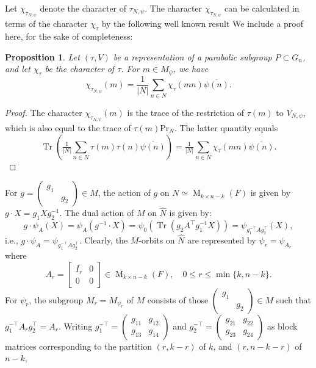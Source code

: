 \documentclass[reqno]{amsart}
\newtheorem{proposition}[theorem]{Proposition}
\theoremstyle{definition}
\theoremstyle{remark}
\numberwithin{equation}{section}
\DeclareMathOperator{\GL}{GL}
\DeclareMathOperator{\M}{M}
\DeclareMathOperator{\tr}{Tr}
\newcommand{\bbsm}{\left (\begin{smallmatrix}}      \newcommand{\besm}{\end{smallmatrix}\right )}
\begin{document}
 Let $\chi_{\tau_{N, \psi}}$ denote the character of $\tau_{N, \psi}$. The character $\chi_{\tau_{N, \psi}}$ can be calculated in terms of the character $\chi_\tau$  by the following well known result 
 We include a proof here, for the sake of completeness:
\begin{proposition} \label{character_Jacquet}
Let $(\tau,V)$ be a representation of a parabolic subgroup $P \subset G_n$,  and let $\chi_\tau$ be the character of $\tau$. For $m \in M_\psi$, we have
\[\chi_{\tau_{N, \psi}}(m) = \frac{1}{|N|}\sum_{n \in N}\chi_{\tau}(mn)\overline{\psi(n)}.\]
\end{proposition}
\begin{proof}
The character  $\chi_{\tau_{N, \psi}}(m)$ is the trace of the restriction of $\tau(m)$ to ${V_{N,\psi}}$, which is also equal to the trace of $\tau(m) \text{Pr}_N$.   The latter quantity equals
\[ \tr\left( \tfrac{1}{|N|} \sum_{n\in N} \tau(m)\tau(n) \overline{\psi(n)}\right)=\tfrac{1}{|N|} \sum_{n\in N}  \chi_{\tau}(mn) \overline{\psi(n)}.\]

\end{proof}
For  $g=\bbsm g_1 & \\& g_2 \besm \in M$, the action of $g$ on $N \simeq \M_{k \times n-k}(F)$ is given by $g \cdot X= g_1 X g_2^{-1}$.
The dual action of $M$ on $\widehat N$ is  given by:  
\[g \cdot \psi_A(X)=\psi_A(g^{-1} \cdot X)=\psi_0(\tr(g_2 A^\top g_1^{-1} X))=\psi_{ g_1^{-\top} A g_2^{\top}}(X),\] 
i.e.,  $g \cdot \psi_A=\psi_{ g_1^{-\top} A g_2^{\top}}$.
Clearly, the $M$-orbits on $\widehat N$ are represented by $\psi_r= \psi_{A_r}$ where
\[A_r=\begin{bmatrix}I_r & 0 \\
0 & 0 \end{bmatrix} \in  \M_{k \times n-k}(F), \quad 0 \leq r \leq \min\{k,n-k\}. \]
For $\psi_r$,  the subgroup $M_r=M_{\psi_r}$ of $M$ consists of those $\bbsm g_1& \\ &  g_2 \besm \in M$ such that  $g_1^{-\top} A_r g_2^{\top}=A_r$. Writing $g_1^{-\top} = \bbsm g_{11} & g_{12} \\ g_{13} & g_{14} \besm$  and 
$g_2^{-\top}=\bbsm g_{21} & g_{22} \\ g_{23} & g_{24} \besm$ as block matrices corresponding to the partition $(r,k-r)$ of $k$, and $(r, n-k-r)$ of $n-k$,
\end{document}
